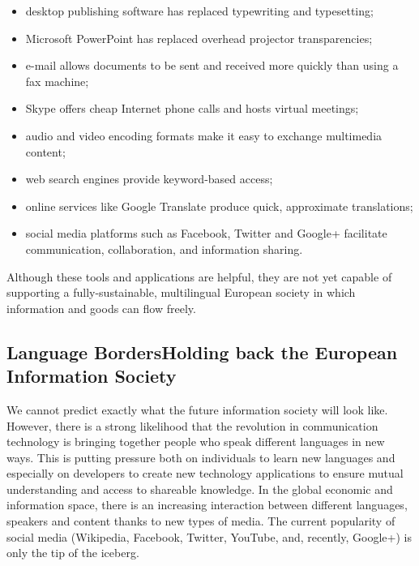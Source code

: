 \begin{multicols}{2}
\begin{itemize}
\item desktop publishing software has replaced typewriting and typesetting;
\item Microsoft PowerPoint has replaced overhead projector transparencies;
\item e-mail allows documents to be sent and received more quickly than using a fax machine;
\item Skype offers cheap Internet phone calls and hosts virtual meetings;
\item audio and video encoding formats make it easy to exchange multimedia content;
\item web search engines provide keyword-based access;
\item online services like Google Translate produce quick, approximate translations;
\item social media platforms such as Facebook, Twitter and Google+ facilitate communication, collaboration, and information sharing.
\end{itemize}

Although these tools and applications are helpful, they are not yet capable of supporting a fully-sustainable, multilingual European society in which information and goods can flow freely.

\subsection[Language Borders Holding Back the European Information Society]{Language Borders\newline Holding back the European Information Society}

We cannot predict exactly what the future information society will look like. However, there is a strong likelihood that the revolution in communication technology is bringing together people who speak different languages in new ways. This is putting pressure both on individuals to learn new languages and especially on developers to create new technology applications to ensure mutual understanding and access to shareable knowledge. In the global economic and information space, there is an increasing interaction between different languages, speakers and content thanks to new types of media. The current popularity of social media (Wikipedia, Facebook, Twitter, YouTube, and, recently, Google+) is only the tip of the iceberg.



\end{multicols}
